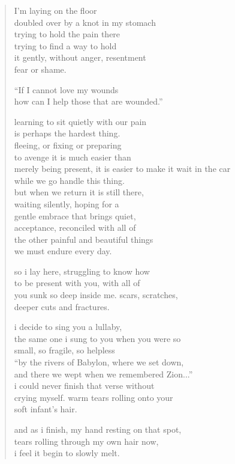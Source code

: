 \begin{verse}
I'm laying on the floor \\
doubled over by a knot in my stomach \\
trying to hold the pain there \\
trying to find a way to hold \\
it gently, without anger, resentment \\
fear or shame.

``If I cannot love my wounds \\
how can I help those that are wounded.''

learning to sit quietly with our pain \\
is perhaps the hardest thing.  \\
fleeing, or fixing or preparing \\
to avenge it is much easier than \\
merely being present, it is easier
to make it wait in the car \\
while we go handle this thing.  \\
but when we return it is still there,  \\
waiting silently, hoping for a  \\
gentle embrace that brings quiet, \\
acceptance, reconciled with all of \\
the other painful and beautiful things \\
we must endure every day.

so i lay here, struggling to know how \\
to be present with you, with all of \\
you sunk so deep inside me. scars, scratches, \\
deeper cuts and fractures.

i decide to sing you a lullaby, \\
the same one i sung to you when you were so \\
small, so fragile, so helpless \\
``by the rivers of Babylon, where we set down, \\
and there we wept when we remembered Zion...'' \\
i could never finish that verse without \\
crying myself. warm tears rolling onto your \\
soft infant's hair.

and as i finish, my hand resting on that spot, \\
tears rolling through my own hair now, \\
i feel it begin to slowly melt. 
\end{verse}
